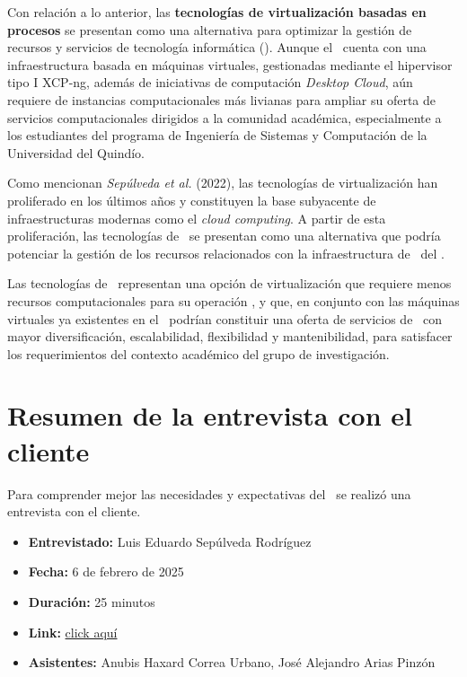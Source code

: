 Con relación a lo anterior, las \textbf{tecnologías de virtualización basadas en procesos} se presentan como una alternativa para optimizar la gestión de recursos y servicios de tecnología informática (\TI). Aunque el \GRID\ cuenta con una infraestructura basada en máquinas virtuales, gestionadas mediante el hipervisor tipo I XCP-ng, además de iniciativas de computación \textit{Desktop Cloud}, aún requiere de instancias computacionales más livianas para ampliar su oferta de servicios computacionales dirigidos a la comunidad académica, especialmente a los estudiantes del programa de Ingeniería de Sistemas y Computación de la Universidad del Quindío.

Como mencionan \textit{Sepúlveda et al.} (2022), las tecnologías de virtualización han proliferado en los últimos años y constituyen la base subyacente de infraestructuras modernas como el \textit{cloud computing}. A partir de esta proliferación, las tecnologías de \VBC\ se presentan como una alternativa que podría potenciar la gestión de los recursos relacionados con la infraestructura de \TI\ del \GRID.

Las tecnologías de \VBC\ representan una opción de virtualización que requiere menos recursos computacionales para su operación \citep{Xavier2013}, y que, en conjunto con las máquinas virtuales ya existentes en el \GRID\, podrían constituir una oferta de servicios de \TI\ con mayor diversificación, escalabilidad, flexibilidad y mantenibilidad, para satisfacer los requerimientos del contexto académico del grupo de investigación.

\section{Resumen de la entrevista con el cliente}

Para comprender mejor las necesidades y expectativas del \GRID\, se realizó una entrevista con el cliente.

\begin{itemize}
	\item \textbf{Entrevistado:} Luis Eduardo Sepúlveda Rodríguez
	\item \textbf{Fecha:} 6 de febrero de 2025
	\item \textbf{Duración:} 25 minutos
	\item \textbf{Link:} \href{https://drive.google.com/file/d/1rIc9xOsyDqumlTV-QXcw0inPyIbSEHLz/view?usp=sharing}{click aquí}
	\item \textbf{Asistentes:} Anubis Haxard Correa Urbano, José Alejandro Arias Pinzón
\end{itemize}

